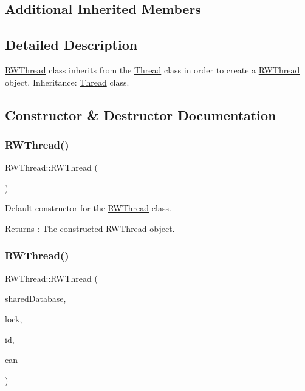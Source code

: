 \subsection*{Additional Inherited Members}


\subsection{Detailed Description}
\hyperlink{class_r_w_thread}{R\+W\+Thread} class inherits from the \hyperlink{class_thread}{Thread} class in order to create a \hyperlink{class_r_w_thread}{R\+W\+Thread} object. Inheritance\+: \hyperlink{class_thread}{Thread} class. 

\subsection{Constructor \& Destructor Documentation}
\mbox{\label{class_r_w_thread_aa69e6643625bba0aefa86d58cd308827}} 
\subsubsection{\texorpdfstring{R\+W\+Thread()}{RWThread()}\hspace{0.1cm}{\footnotesize\ttfamily [1/2]}}
{\footnotesize\ttfamily R\+W\+Thread\+::\+R\+W\+Thread (\begin{DoxyParamCaption}{ }\end{DoxyParamCaption})}



Default-\/constructor for the \hyperlink{class_r_w_thread}{R\+W\+Thread} class. 

\begin{DoxyReturn}{Returns}
\+: The constructed \hyperlink{class_r_w_thread}{R\+W\+Thread} object. 
\end{DoxyReturn}
\mbox{\label{class_r_w_thread_a907cf42de1454ec96ec5620114046f92}} 
\subsubsection{\texorpdfstring{R\+W\+Thread()}{RWThread()}\hspace{0.1cm}{\footnotesize\ttfamily [2/2]}}
{\footnotesize\ttfamily R\+W\+Thread\+::\+R\+W\+Thread (\begin{DoxyParamCaption}\item[{\hyperlink{class_r_w_database}{R\+W\+Database}$<$ \hyperlink{classtsgl_1_1_rectangle}{Rectangle} $\ast$$>$ \&}]{shared\+Database,  }\item[{\hyperlink{class_lock}{Lock} \&}]{lock,  }\item[{unsigned long}]{id,  }\item[{\hyperlink{classtsgl_1_1_canvas}{Canvas} \&}]{can }\end{DoxyParamCaption})}



